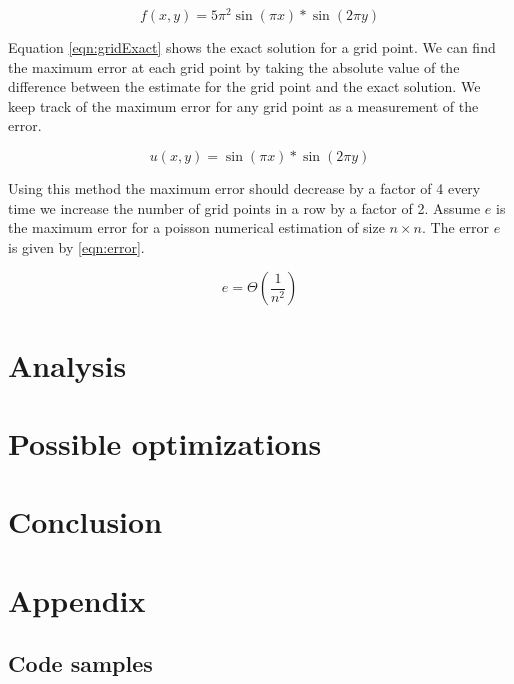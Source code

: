 \documentclass{article}
\begin{document}
	\begin{equation}
		\label{eqn:gridInitial}
		f(x,y) = 5\pi^2 \sin(\pi x)* \sin(2\pi y)
	\end{equation}

	Equation \ref{eqn:gridExact} shows the exact solution for a grid point. We can find the maximum error at each grid point by taking the absolute value of the difference between the estimate for the grid point and the exact solution. We keep track of the maximum error for any grid point as a measurement of the error.

	\begin{equation}
		\label{eqn:gridExact}
		u(x,y) = \sin(\pi x) * \sin(2 \pi y)
	\end{equation}

	Using this method the maximum error should decrease by a factor of 4 every time we increase the number of grid points in a row by a factor of 2. Assume $e$ is the maximum error for a poisson numerical estimation of size $n \times n$. The error $e$ is given by \ref{eqn:error}.

	\begin{equation}
		\label{eqn:error}
		e = \Theta(\frac{1}{n^2})
	\end{equation}

	

\section{Analysis}

\section{Possible optimizations}

\newpage
\section{Conclusion}

\section{Appendix}
\subsection{Code samples}
\end{document}
